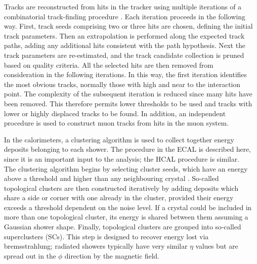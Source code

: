 Tracks are reconstructed from hits in the tracker using multiple iterations of a combinatorial track-finding procedure \cite{TrackReco}.
Each iteration proceeds in the following way.
First, track seeds comprising two or three hits are chosen, defining the initial track parameters.
Then an extrapolation is performed along the expected track paths, adding any additional hits consistent with the path hypothesis.
Next the track parameters are re-estimated, and the track candidate collection is pruned based on quality criteria.
All the selected hits are then removed from consideration in the following iterations.
In this way, the first iteration identifies the most obvious tracks, normally those with high \pt and near to the interaction point.
The complexity of the subsequent iteration is reduced since many hits have been removed.
This therefore permits lower thresholds to be used and tracks with lower \pt or highly displaced tracks to be found.
In addition, an independent procedure is used to construct muon tracks from hits in the muon system.

In the calorimeters, a clustering algorithm is used to collect together energy deposits belonging to each shower. %
The procedure in the ECAL is described here, since it is an important input to the \Hgg analysis; the HCAL procedure is similar.
The clustering algorithm begins by selecting cluster seeds, which have an energy above a threshold and higher than any neighbouring crystal \cite{PhotonReco}.
So-called topological clusters are then constructed iteratively by adding deposits which share a side or corner with one already in the cluster, 
provided their energy exceeds a threshold dependent on the noise level. %
If a crystal could be included in more than one topological cluster, its energy is shared between them assuming a Gaussian shower shape.
Finally, topological clusters are grouped into so-called superclusters (SCs).
This step is designed to recover energy lost via bremsstrahlung; 
radiated showers typically have very similar $\eta$ values 
but are spread out in the $\phi$ direction by the magnetic field.

